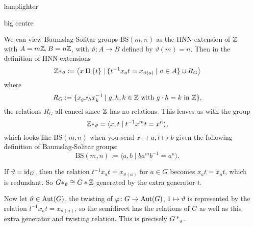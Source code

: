 \begin{ex}
    lamplighter
\end{ex}
\begin{ex}
    big centre
\end{ex}
\begin{ex}
    We can view Baumslag-Solitar groups $\mathrm{BS}(m,n)$ as the HNN-extension of $\mathbb{Z}$ with $A=m\mathbb{Z}, B= n \mathbb{Z}$, with $\vartheta \colon A \to B $ defined by $\vartheta (m)=n$. Then in the definition of HNN-extensions
    \[
        \mathbb{Z} * _{\vartheta} := \left\langle x \amalg \{t\} \mid  \{t ^{-1} x_a t = x _{\vartheta(a)}\mid a \in A\} \cup R_G  \right\rangle 
    \] where \[
    R_G := \{x_g x_h x_k ^{-1} \mid g,h ,k \in \mathbb{Z} \text{ with } g \cdot h =k \text{ in } \mathbb{Z}\} ,
    \]the relations $R_G$ all cancel since $\mathbb{Z}$ has no relations. This leaves us with the group \[
    \mathbb{Z} * _{\vartheta} = \langle x,t \mid t ^{-1} x^m t = x^n \rangle ,
\] which looks like $\mathrm{BS}(m,n)$ when you send $x \mapsto a, t \mapsto  b$ given the following definition of Baumslag-Solitar groups:
    \[
        \mathrm{BS}(m,n) := \langle a,b \mid  b a^m b^{-1} = a^n  \rangle .
    \]
\end{ex}
\begin{ex}
    If $\vartheta=\operatorname{id}_G$, then the relation  $t^{-1} x_at=x_{\vartheta(a)}$ for $a \in G$ becomes $x_at=x_at$, which is redundant. So $G *_{\vartheta}\cong G * \mathbb{Z}$ generated by the extra generator $t$.

    Now let $\vartheta \in \mathrm{Aut}(G)$, the twisting of $\varphi \colon G \to \mathrm{Aut}(G)$, $1 \mapsto \vartheta$ is represented by the relation $t ^{-1} x_a t = x _{\vartheta(a)}$, so the semidirect has the relations of $G$ as well as this extra generator and twisting relation. This is precisely $G *_{\vartheta}$.
\end{ex}
